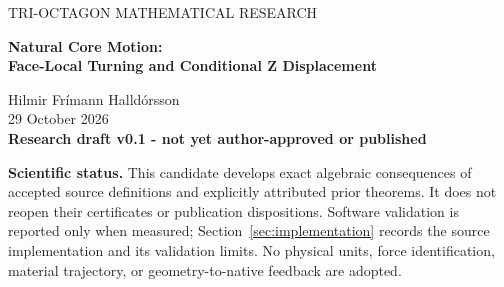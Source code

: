 \documentclass[11pt,a4paper]{article}
\numberwithin{equation}{section}
\theoremstyle{definition}
\theoremstyle{remark}
\begin{document}
\begin{center}
{\small\color{blue!45!black} TRI-OCTAGON MATHEMATICAL RESEARCH}\\[5mm]
{\LARGE\bfseries Natural Core Motion:\\[1mm]
Face-Local Turning and Conditional Z Displacement\par}
\vspace{5mm}
{\large Hilmir Frímann Halldórsson}\\[3mm]
29 October 2026\\[2mm]
{\small\bfseries Research draft v0.1 - not yet author-approved or published}
\end{center}

\begin{abstract}
The accepted Tri-Octagon recurrence evolves three complex channel values,
while its face decoder, axial attachment, and conditional Z placement assign
different geometric meanings to that state. We derive the motion consequences
of these existing maps without adding a material-core law. Matched transport
makes the decoded complex mean the collective vector in each face frame, and
its signed two-step turn transfers exactly to the corresponding outward face
normal. Common complex phase produces rotations within the three fixed face
planes; a pairwise-dot-product obstruction prevents a general interpretation
as one rigid ambient rotation. The staged Z placement is invariant under
that same common phase when observer settings are held fixed. An exact
telescoping identity separates native, envelope, and clock contributions to
its displacement. The completed coherent-domain theorem implies stationary
nonzero face vectors and a generally nonzero frozen-observer limit, whereas
the running staged envelope makes the placed point approach the center.
The accepted M3 cycle gives two alternating placed points at fixed observer
settings. These are deductions from inherited definitions and results. An
observer-only application design exposes the distinctions; the missing
relationship remains the assignment of native state information to the pose
of the central surface.
\end{abstract}

\textbf{Scientific status.}
This candidate develops exact algebraic consequences of accepted source
definitions and explicitly attributed prior theorems. It does not reopen
their certificates or publication dispositions. Software validation is
reported only when measured; Section~\ref{sec:implementation} records the
source implementation and its validation limits. No physical units, force identification, material
trajectory, or geometry-to-native feedback are adopted.
\end{document}
